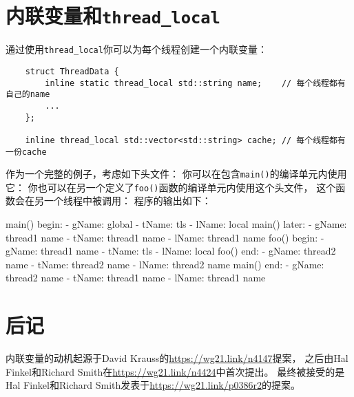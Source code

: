 \section{内联变量和\texttt{thread\_local}}
通过使用\texttt{thread\_local}你可以为每个线程创建一个内联变量：
\begin{lstlisting}
    struct ThreadData {
        inline static thread_local std::string name;    // 每个线程都有自己的name
        ...
    };

    inline thread_local std::vector<std::string> cache; // 每个线程都有一份cache
\end{lstlisting}
作为一个完整的例子，考虑如下头文件：
你可以在包含\texttt{main()}的编译单元内使用它：
你也可以在另一个定义了\texttt{foo()}函数的编译单元内使用这个头文件，
这个函数会在另一个线程中被调用：
程序的输出如下：
\begin{blacklisting}
    main() begin:
    - gName: global
    - tName: tls
    - lName: local
    main() later:
    - gName: thread1 name
    - tName: thread1 name
    - lName: thread1 name
    foo() begin:
    - gName: thread1 name
    - tName: tls
    - lName: local
    foo() end:
    - gName: thread2 name
    - tName: thread2 name
    - lName: thread2 name
    main() end:
    - gName: thread2 name
    - tName: thread1 name
    - lName: thread1 name
\end{blacklisting}

\section{后记}
内联变量的动机起源于David Krauss的\url{https://wg21.link/n4147}提案，
之后由Hal Finkel和Richard Smith在\url{https://wg21.link/n4424}中首次提出。
最终被接受的是Hal Finkel和Richard Smith发表于\url{https://wg21.link/p0386r2}的提案。
